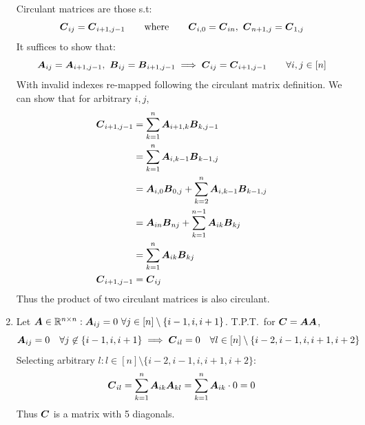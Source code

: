 \documentclass[]{exam}
\begin{document}
\begin{questions}
\begin{enumerate}[label=\arabic*.]
		Circulant matrices are those s.t:
		$$
		\boldsymbol{C}_{ij} = \boldsymbol{C}_{i + 1, j - 1}
		\qquad \text{where} \qquad
		\boldsymbol{C}_{i,0} = \boldsymbol{C}_{in},~\boldsymbol{C}_{n+1,j} = \boldsymbol{C}_{1,j}
		$$
		It suffices to show that:
		$$
		\boldsymbol{A}_{ij} = \boldsymbol{A}_{i + 1, j - 1},~
		\boldsymbol{B}_{ij} = \boldsymbol{B}_{i + 1, j - 1} \implies
		\boldsymbol{C}_{ij} = \boldsymbol{C}_{i + 1, j - 1} \qquad \forall i, j \in [n]
		$$
		With invalid indexes re-mapped following the circulant matrix definition.
		We can show that for arbitrary $i,j$,
		\begin{align*}
			\boldsymbol{C}_{i+1,j-1} &= \sum^{n}_{k=1} \boldsymbol{A}_{i+1, k} \boldsymbol{B}_{k,j-1} \\
			&= \sum^{n}_{k=1} \boldsymbol{A}_{i, k - 1} \boldsymbol{B}_{k-1,j} \\
			&= \boldsymbol{A}_{i, 0} \boldsymbol{B}_{0,j} + \sum^{n}_{k=2} \boldsymbol{A}_{i, k - 1} \boldsymbol{B}_{k-1,j} \\
			&= \boldsymbol{A}_{in} \boldsymbol{B}_{nj} + \sum^{n-1}_{k=1} \boldsymbol{A}_{ik} \boldsymbol{B}_{kj} \\
			&= \sum^{n}_{k=1} \boldsymbol{A}_{ik} \boldsymbol{B}_{kj} \\
			\boldsymbol{C}_{i+1,j-1} &= \boldsymbol{C}_{ij}
		\end{align*}
		Thus the product of two circulant matrices is also circulant.
	\item Let $\boldsymbol{A} \in \mathbb{R}^{n \times n} : \boldsymbol{A}_{ij} = 0~\forall j \in [n] \setminus \{i-1, i, i+1\}$. T.P.T.~for $\boldsymbol{C} = \boldsymbol{A} \boldsymbol{A}$,
		$$ \boldsymbol{A}_{ij} = 0 \quad \forall j \not\in \{i-1, i, i+1\}
		\implies \boldsymbol{C}_{il} = 0 \quad \forall l \in [n] \setminus \{i - 2, i - 1, i, i + 1, i + 2 \}
		$$
		Selecting arbitrary $l : l \in [n] \setminus \{i - 2, i - 1, i, i + 1, i + 2 \}$:
		$$ \boldsymbol{C}_{il} = \sum^n_{k=1} \boldsymbol{A}_{ik} \boldsymbol{A}_{kl} = \sum^n_{k=1} \boldsymbol{A}_{ik} \cdot 0 = 0 $$
		Thus $\boldsymbol{C}$ is a matrix with 5 diagonals.
\end{enumerate}

\newpage
\question
\hfill


\end{questions}
\end{document}

